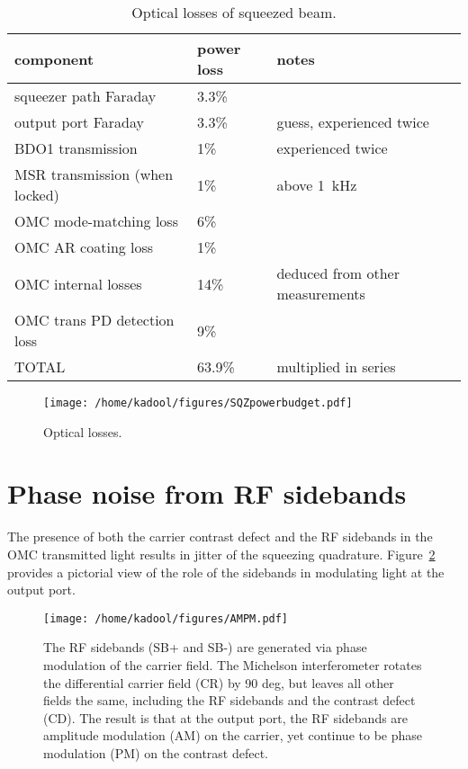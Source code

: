 \documentclass{ligodoc}
\begin{document}
\begin{table}
\centering
\caption{Optical losses of squeezed beam.}
\begin{tabular}{l l l} %
\hline
component & power loss & notes \\
\hline
squeezer path Faraday & 3.3\% & \\
output port Faraday & 3.3\% & guess, experienced twice \\
BDO1 transmission & 1\% & experienced twice \\
MSR transmission (when locked) & 1\% & above 1~kHz \\
OMC mode-matching loss & 6\% & \\
OMC AR coating loss & 1\% & \\
OMC internal losses & 14\% & deduced from other measurements \\ 
OMC trans PD detection loss & 9\% & \\
\hline
TOTAL & 63.9\% & multiplied in series \\
\hline
\end{tabular}
\label{tab:losses}
\end{table}


\begin{figure}
\begin{centering}
\texttt{[image: /home/kadool/figures/SQZpowerbudget.pdf]}
\caption{Optical losses.}
\label{fig:powerbudget}
\end{centering}
\end{figure}



\section{Phase noise from RF sidebands}
The presence of both the carrier contrast defect and the RF sidebands
in the OMC transmitted light results in jitter of the squeezing
quadrature. Figure~\ref{fig:AMPM} provides a pictorial view of the
role of the sidebands in modulating light at the output port. 

\begin{figure}
\begin{centering}
\texttt{[image: /home/kadool/figures/AMPM.pdf]}
\caption{The RF sidebands (SB+ and SB-) are generated via phase
  modulation of the carrier field. The Michelson interferometer
  rotates the differential carrier field (CR) by 90 deg, but leaves
  all other fields the same, including the RF sidebands and the
  contrast defect (CD). The result is that at the output port, the RF
  sidebands are amplitude modulation (AM) on the carrier, yet continue
  to be phase modulation (PM) on the contrast defect.}
\label{fig:AMPM}
\end{centering}
\end{figure}
\end{document}
